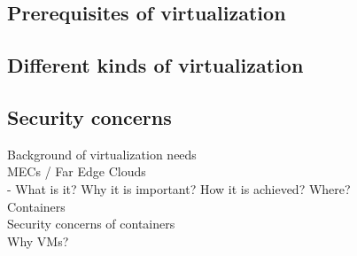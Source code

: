 \subsection{Prerequisites of virtualization}

\subsection{Different kinds of virtualization}

\subsection{Security concerns}



Background of virtualization needs \\
MECs / Far Edge Clouds \\
    - What is it? Why it is important? How it is achieved? Where? \\
Containers \\
Security concerns of containers \\
Why VMs? \\



